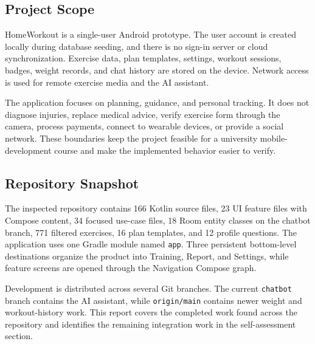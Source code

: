 \subsection{Project Scope}

HomeWorkout is a single-user Android prototype. The user account is created locally during database seeding, and there is no sign-in server or cloud synchronization. Exercise data, plan templates, settings, workout sessions, badges, weight records, and chat history are stored on the device. Network access is used for remote exercise media and the AI assistant.

The application focuses on planning, guidance, and personal tracking. It does not diagnose injuries, replace medical advice, verify exercise form through the camera, process payments, connect to wearable devices, or provide a social network. These boundaries keep the project feasible for a university mobile-development course and make the implemented behavior easier to verify.

\subsection{Repository Snapshot}

The inspected repository contains 166 Kotlin source files, 23 UI feature files with Compose content, 34 focused use-case files, 18 Room entity classes on the chatbot branch, 771 filtered exercises, 16 plan templates, and 12 profile questions. The application uses one Gradle module named \texttt{app}. Three persistent bottom-level destinations organize the product into Training, Report, and Settings, while feature screens are opened through the Navigation Compose graph.

Development is distributed across several Git branches. The current \texttt{chatbot} branch contains the AI assistant, while \texttt{origin/main} contains newer weight and workout-history work. This report covers the completed work found across the repository and identifies the remaining integration work in the self-assessment section.
